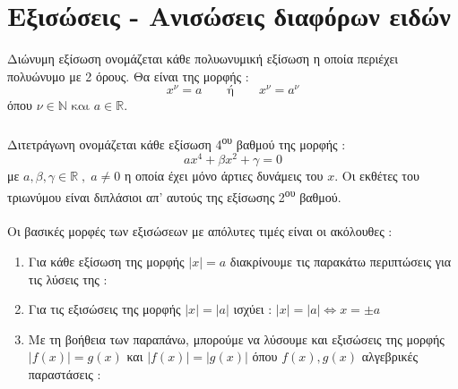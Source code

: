 \section{Εξισώσεις - Ανισώσεις διαφόρων ειδών}
\orismoi
{}
Διώνυμη εξίσωση ονομάζεται κάθε πολυωνυμική εξίσωση η οποία περιέχει πολυώνυμο με 2 όρους. Θα είναι της μορφής :
\[ x^\nu=a\qquad\textrm{ή}\qquad x^\nu=a^\nu \] όπου  $ \nu\in\mathbb{N}\textrm{ και }a\in\mathbb{R} $. \\\\
Διτετράγωνη ονομάζεται κάθε εξίσωση 4\textsuperscript{ου} βαθμού της μορφής :
\[ ax^4+\beta x^2+\gamma=0 \]
με $ a,\beta,\gamma\in\mathbb{R}\;,\;a\neq0 $ η οποία έχει μόνο άρτιες δυνάμεις του $ x $. Οι εκθέτες του τριωνύμου είναι διπλάσιοι απ' αυτούς της εξίσωσης 2\textsuperscript{ου} βαθμού.\\\\
\thewrhmata
{}
Οι βασικές μορφές των εξισώσεων με απόλυτες τιμές είναι οι ακόλουθες :
\begin{enumerate}[itemsep=0mm]
\item Για κάθε εξίσωση της μορφής $ |x|=a $ διακρίνουμε τις παρακάτω περιπτώσεις για τις λύσεις της :
\item Για τις εξισώσεις της μορφής $ |x|=|a| $ ισχύει : $ |x|=|a|\Leftrightarrow x=\pm a $
\item Με τη βοήθεια των παραπάνω, μπορούμε να λύσουμε και εξισώσεις της μορφής $ \left|f(x) \right|=g(x)  $ και $ \left|f(x) \right| =\left|g(x) \right|  $ όπου $ f(x),g(x) $ αλγεβρικές παραστάσεις :
\end{enumerate}
